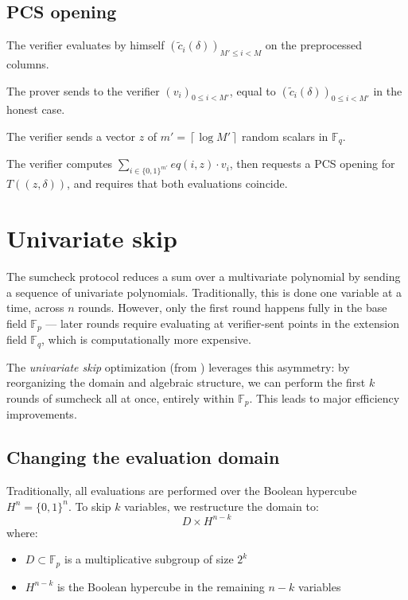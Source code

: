 \documentclass{article}
\newcommand{\Fp}{\mathbb F_p}
\newcommand{\Fq}{\mathbb F_q}
\newcommand{\Pol}{T}
\begin{document}
\subsection{PCS opening}

The verifier evaluates by himself $(\tilde{c}_i(\delta))_{M' \leq i < M}$ on the preprocessed columns.

The prover sends to the verifier $(v_i)_{0 \leq i < M'}$, equal to $(\tilde{c}_i(\delta))_{0 \leq i < M'}$ in the honest case.

The verifier sends a vector $z$ of $m' = \left\lceil  \log M' \right\rceil$ random scalars in $\Fq$.

The verifier computes $\sum_{i \in \{0, 1\}^{m'}} eq(i, z) \cdot v_i$, then requests a PCS opening for $\Pol((z, \delta))$, and requires that both evaluations coincide.



\section{Univariate skip}


The sumcheck protocol reduces a sum over a multivariate polynomial by sending a sequence of univariate polynomials. Traditionally, this is done one variable at a time, across $n$ rounds. However, only the first round happens fully in the base field $\Fp$ — later rounds require evaluating at verifier-sent points in the extension field $\Fq$, which is computationally more expensive.

The \emph{univariate skip} optimization (from \cite{univariate_skip}) leverages this asymmetry: by reorganizing the domain and algebraic structure, we can perform the first $k$ rounds of sumcheck all at once, entirely within $\Fp$. This leads to major efficiency improvements.


\subsection{Changing the evaluation domain}

Traditionally, all evaluations are performed over the Boolean hypercube $H^n = \{0,1\}^n$. To skip $k$ variables, we restructure the domain to:
\begin{equation}
    D \times H^{n - k}
\end{equation}
where:
\begin{itemize}
    \item $D \subset \Fp$ is a multiplicative subgroup of size $2^k$
    \item $H^{n - k}$ is the Boolean hypercube in the remaining $n - k$ variables
\end{itemize}
\end{document}
